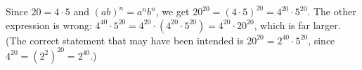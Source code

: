 Since $20=4\cdot5$ and $(ab)^n=a^nb^n$, we get $20^{20}=(4\cdot5)^{20}=\boxed{4^{20}\cdot5^{20}}$. The other expression is wrong: $4^{40}\cdot5^{20}=4^{20}\cdot\left(4^{20}\cdot5^{20}\right)=4^{20}\cdot20^{20}$, which is far larger. (The correct statement that may have been intended is $20^{20}=2^{40}\cdot5^{20}$, since $4^{20}=\left(2^2\right)^{20}=2^{40}$.)
